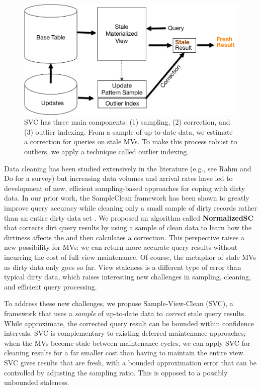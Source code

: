 \begin{figure}[t] \vspace{-2em}
\centering
 \includegraphics[scale=0.30]{figs/sys-arch.pdf} \vspace{-.25em}
 \caption{ SVC has three main components: (1) sampling, (2) correction, and (3) outlier indexing. From a sample of up-to-date data, we estimate
 a correction for queries on stale MVs. To make this process robust to outliers, we apply a technique called outlier indexing. \label{sys-arch}}\vspace{-1.75em}
\end{figure}

Data cleaning has been studied extensively in the literature (e.g., see Rahm and Do for a survey\cite{rahm2000data}) but increasing data volumes and arrival rates have led to development of new, efficient sampling-based approaches for coping with dirty data.   
In our prior work, the SampleClean framework has been shown to greatly improve query accuracy while cleaning only a small sample of dirty records rather than an entire dirty data set \cite{wang1999sample}.  
We proposed an algorithm called \textbf{NormalizedSC} that corrects dirt query results by using a sample of clean data to learn how the dirtiness affects the and then calculates a correction.  
This perspective raises a new possibility for MVs: we can return more accurate query results without incurring the cost of full view maintenance.
Of course, the metaphor of stale MVs as dirty data only goes so far. 
View staleness is a different type of error than typical dirty data, which raises interesting new challenges in sampling, cleaning, and efficient query processing.

To address these new challenges, we propose Sample-View-Clean (SVC), a framework that uses a \emph{sample} of up-to-date data to \emph{correct} stale query results.  
While approximate, the corrected query result can be bounded within confidence intervals.
SVC is complementary to existing deferred maintenance approaches; when the MVs become stale between maintenance cycles, we can apply SVC for cleaning results for a far smaller cost than having to maintain the entire view.
SVC gives results that are fresh, with a bounded approximation error that can be controlled by adjusting the sampling ratio.
This is opposed to a possibly unbounded staleness.

